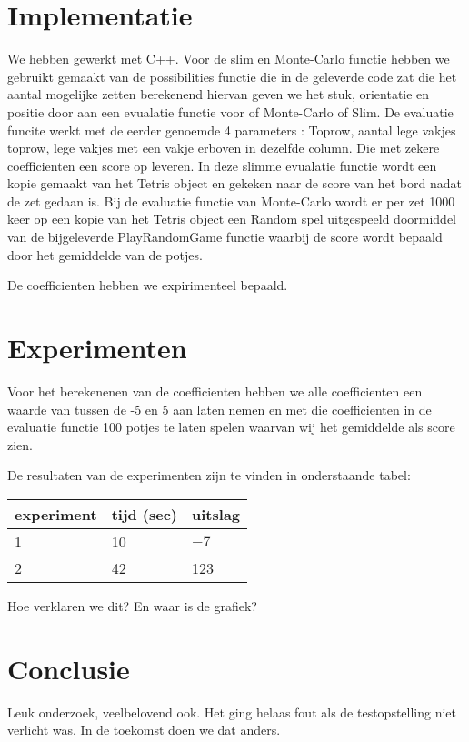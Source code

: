 \documentclass[10pt]{article}
\begin{document}
\section{Implementatie}

We hebben gewerkt met C++. Voor de slim en Monte-Carlo functie hebben we gebruikt gemaakt van de possibilities functie die in de geleverde code zat die het aantal mogelijke zetten berekenend hiervan geven we het stuk, orientatie en positie door aan een evualatie functie voor of Monte-Carlo of Slim. De evaluatie funcite werkt met de eerder genoemde 4 parameters : Toprow, aantal lege vakjes toprow, lege vakjes met een vakje erboven in dezelfde column. Die met zekere coefficienten een score op leveren. In deze slimme evualatie functie wordt een kopie gemaakt van het Tetris object en gekeken naar de score van het bord nadat de zet gedaan is. Bij de evaluatie functie van Monte-Carlo wordt er per zet 1000 keer op een kopie van het Tetris object een Random spel uitgespeeld doormiddel van de bijgeleverde PlayRandomGame functie waarbij de score wordt bepaald door het gemiddelde van de potjes.

De coefficienten hebben we expirimenteel bepaald.

\section{Experimenten}

Voor het berekenenen van de coefficienten hebben we alle coefficienten een waarde van tussen de -5 en 5 aan laten nemen en met die coefficienten in de evaluatie functie 100 potjes te laten spelen waarvan wij het gemiddelde als score zien.


De resultaten van de experimenten zijn te
vinden in onderstaande tabel:

\begin{center}
\begin{tabular}{l|l|l}
experiment & tijd (sec) & uitslag\\
\hline
1 & 10 & $-7$\\
2 & 42 & 123
\end{tabular}
\end{center}
Hoe verklaren we dit? En waar is de grafiek?

\section{Conclusie}

Leuk onderzoek, veelbelovend ook. Het ging helaas 
fout als de testopstelling niet verlicht was.
In de toekomst doen we dat anders.
\end{document}
